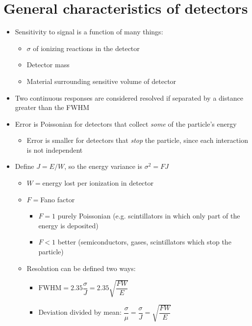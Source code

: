 \section{General characteristics of detectors}
\begin{itemize}
  \item Sensitivity to signal is a function of many things:
  \begin{itemize}
    \item $\sigma$ of ionizing reactions in the detector
    \item Detector mass
    \item Material surrounding sensitive volume of detector
  \end{itemize}
  \item Two continuous responses are considered resolved if separated by a distance greater than the FWHM
  \item Error is Poissonian for detectors that collect \emph{some} of the particle's energy
  \begin{itemize}
    \item Error is smaller for detectors that \emph{stop} the particle, since each interaction is not independent
  \end{itemize}
  \item Define $J=E/W$, so the energy variance is $\sigma^2=FJ$
  \begin{itemize}
    \item $W=$energy lost per ionization in detector
    \item $F=$Fano factor
    \begin{itemize}
      \item $F=1$ \thus purely Poissonian (e.g. scintillators in which only part of the energy is deposited)
      \item $F<1$ \thus better (semiconductors, gases, scintillators which stop the particle)
    \end{itemize}
    \item Resolution can be defined two ways:
    \begin{itemize}
      \item $\text{FWHM} = 2.35 \dfrac{\sigma}{J} = 2.35\sqrt{\dfrac{FW}{E}}$
      \item Deviation divided by mean: $\dfrac{\sigma}{\mu} = \dfrac{\sigma}{J} = \sqrt{\dfrac{FW}{E}}$
    \end{itemize}
  \end{itemize}
\end{itemize}

